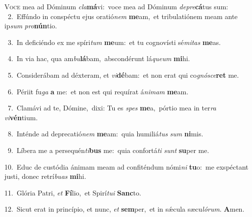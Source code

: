 \lettrine{\initial\textcolor{\initialcolor}{V}}{oce} mea ad Dóminum \textit{cla}\-\textbf{má}vi:~\star voce mea ad Dóminum \textit{de}\-\textit{pre}\textbf{cá}tus sum:\\
{\numbfont\textcolor{\numbcolor}{~2.}}~Effúndo in conspéctu ejus oratió\textit{nem} \textbf{me}\-am,~\star et tribulatiónem meam ante ip\textit{sum} \textit{pro}\-\textbf{nún}tio.\par
{\numbfont\textcolor{\numbcolor}{~3.}}~In deficiéndo ex me spíri\textit{tum} \textbf{me}\-um:~\star et tu cognovísti sé\-\textit{mi}\-\textit{tas} \textbf{me}\-as.\par
{\numbfont\textcolor{\numbcolor}{~4.}}~In via hac, qua am\-\textit{bu}\-\textbf{lá}bam,~\star abscondérunt lá\-\textit{que}\-\textit{um} \textbf{mi}\-hi.\par
{\numbfont\textcolor{\numbcolor}{~5.}}~Considerábam ad déxteram, et \textit{vi}\-\textbf{dé}bam:~\star et non erat qui co\-\textit{gnó}\-\textit{sce}\textbf{ret} me.\par
{\numbfont\textcolor{\numbcolor}{~6.}}~Périit fu\textit{ga} \textbf{a} me:~\star et non est qui requírat á\-\textit{ni}\-\textit{mam} \textbf{me}\-am.\par
{\numbfont\textcolor{\numbcolor}{~7.}}~Clamávi ad te, Dómine,~\dagger dixi: Tu es \textit{spes} \textbf{me}\-a,~\star pórtio mea in ter\textit{ra} \textit{vi}\-\textbf{vén}tium.\par
{\numbfont\textcolor{\numbcolor}{~8.}}~Inténde ad deprecatió\textit{nem} \textbf{me}\-am:~\star quia humiliá\textit{tus} \textit{sum} \textbf{ni}\-mis.\par
{\numbfont\textcolor{\numbcolor}{~9.}}~Líbera me a persequén\-\textit{ti}\-\textbf{bus} me:~\star quia confortá\textit{ti} \textit{sunt} \textbf{su}\-per me.\par
{\numbfont\textcolor{\numbcolor}{10.}}~Educ de custódia ánimam meam ad confiténdum nómi\textit{ni} \textbf{tu}\-o:~\star me exspéctant justi, donec retrí\-\textit{bu}\-\textit{as} \textbf{mi}\-hi.\par
{\numbfont\textcolor{\numbcolor}{11.}}~Glória Patri, \textit{et} \textbf{Fí}\-lio,~\star et Spirí\-\textit{tu}\-\textit{i} \textbf{Sanc}\-to.\par
{\numbfont\textcolor{\numbcolor}{12.}}~Sicut erat in princípio, et nunc, \textit{et} \textbf{sem}\-per,~\star et in sǽcula sæcu\-\textit{ló}\-\textit{rum}. \textbf{A}\-men.\par
